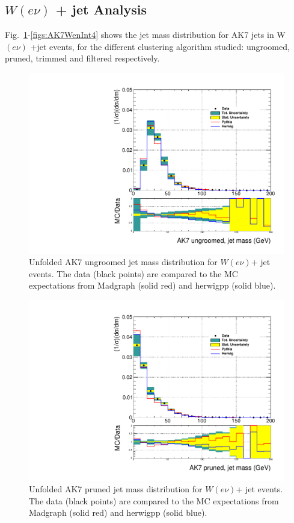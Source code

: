 \clearpage

\subsection{$W(e\nu)$ + jet Analysis}

Fig.~\ref{figs:AK7WenInt1}-\ref{figs:AK7WenInt4} shows the jet mass distribution for AK7 jets in W$(e\nu)$ +jet events, for the different clustering algorithm studied: ungroomed, pruned, trimmed and filtered respectively.

\begin{figure}[!htb]\centering\includegraphics[width=1.\textwidth]{figs/Wen/jetmassunf_ak7_allpT.pdf}
\caption{Unfolded AK7 ungroomed jet mass distribution for $W(e\nu)$+ jet events. The data (black points) are compared to the MC expectations from Madgraph (solid red) and herwigpp (solid blue).}
\label{figs:AK7WenInt1}
\end{figure}

\begin{figure}[!htb]\centering\includegraphics[width=1.\textwidth]{figs/Wen/jetmassunf_ak7pr_allpT.pdf}
\caption{Unfolded AK7 pruned jet mass distribution for $W(e\nu)$+ jet events. The data (black points) are compared to the MC expectations from Madgraph (solid red) and herwigpp (solid blue).}
\label{figs:AK7WenInt2}
\end{figure}


